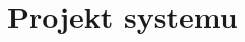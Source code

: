 \chapter{Projekt systemu}
\begin{comment}
\section{Analiza wymagań}
\subsection{Wymagania funkcjonalne}
\subsection{Ograniczenia projektu}

\section{Opis komponentów systemu}
\subsection{Warstwa danych}
\subsection{Warstwa logiki}
\subsection{Warstwa interfejsu użytkownika}
\end{comment}
